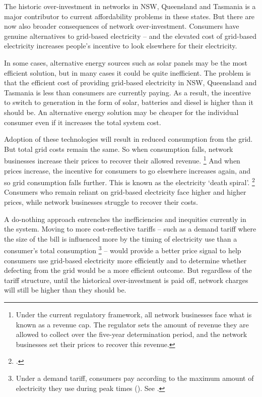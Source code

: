 \documentclass[FrontPage]{grattan}
\begin{document}
The historic over-investment in networks in NSW, Queensland and Tasmania is a major contributor to current affordability problems in these states. But there are now also broader consequences of network over-investment. Consumers have genuine alternatives to grid-based electricity -- and the elevated cost of grid-based electricity increases people's  incentive to look elsewhere for their electricity. 

In some cases, alternative energy sources such as solar panels may be the most efficient solution, but in many cases it could be quite inefficient. The problem is that the efficient cost of providing grid-based electricity in NSW, Queensland and Tasmania is less than consumers are currently paying. As a result, the incentive to switch to generation in the form of solar, batteries and diesel is higher than it should be. An alternative energy solution may be cheaper for the individual consumer even if it increases the total system cost.

Adoption of these technologies will result in reduced consumption from the grid. But total grid costs remain the same. So when consumption falls, network businesses increase their prices to recover their allowed revenue.%
\footnote{Under the current regulatory framework, all network businesses face what is known as a revenue cap. The regulator sets the amount of revenue they are allowed to collect over the five-year determination period, and the network businesses set their prices to recover this revenue.}
And when prices increase, the incentive for consumers to go elsewhere increases again, and so grid consumption falls further. This is known as the electricity `death spiral'.%
\footcite{simshauser2012energy}
Consumers who remain reliant on grid-based electricity face higher and higher prices, while network businesses struggle to recover their costs.

A do-nothing approach entrenches the inefficiencies and inequities currently in the system. Moving to more cost-reflective tariffs -- such as a demand tariff where the size of the bill is influenced more by the timing of electricity use than a consumer's total consumption%
\footnote{Under a demand tariff, consumers pay according to the maximum amount of electricity they use during peak times (). See \textcite{WoodCarter-Fair-pricing-for-power}.} 
-- would provide a better price signal to help consumers use grid-based electricity more efficiently and to determine whether defecting from the grid would be a more efficient outcome. But regardless of the tariff structure, until the historical over-investment is paid off, network charges will still be higher than they should be. 
\end{document}
